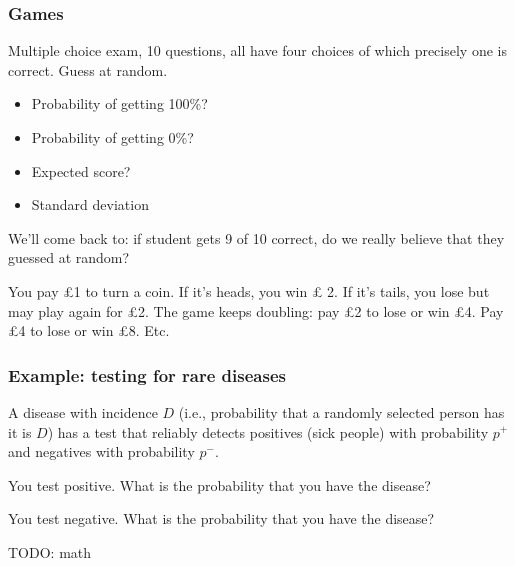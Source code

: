 \documentclass[t]{beamer}
\newcommand\var[0]{\mathbf{Var}}
\begin{document}
\begin{frame}
  \frametitle{Games}

   {
    Multiple choice exam, 10 questions, all have four choices of which
    precisely one is correct.  Guess at random.
    \begin{itemize}
    \item Probability of getting 100\%? 
    \item Probability of getting 0\%? 
    \item Expected score? 
    \item Standard deviation \only<5>{$\var(X) = \frac 14 \frac 34 = \frac 3{16}$}
    \end{itemize}
    We'll come back to: if student gets 9 of 10 correct, do we really
    believe that they guessed at random?
  }

   {
    
  }
   {
    
  }

   {
    You pay \pounds 1 to turn a coin.  If it's heads, you win \pounds
    2.  If it's tails, you lose but may play again for \pounds 2.  The
    game keeps doubling: pay \pounds 2 to lose or win \pounds 4.  Pay
    \pounds 4 to lose or win \pounds 8.  Etc.
  }

\end{frame}

\begin{frame}
  \frametitle{Example: testing for rare diseases}

  A disease with incidence $D$ (i.e., probability that a randomly
  selected person has it is $D$) has a test that reliably detects
  positives (sick people) with probability $p^+$ and negatives with
  probability $p^-$.

  You test positive.  What is the probability that you have the disease?

  You test negative.  What is the probability that you have the
  disease?

  TODO: math
\end{frame}
\end{document}

